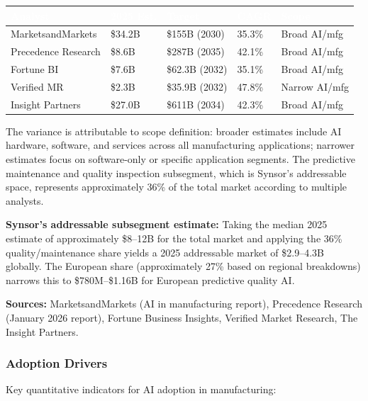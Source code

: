 \documentclass[11pt,letterpaper]{article}
\newcommand{\tableheader}[1]{\textbf{\sffamily\textcolor{white}{#1}}}
\begin{document}
\begin{center}
\begin{tabularx}{\textwidth}{L{3.5cm}C{2cm}C{2cm}C{1.5cm}C{2cm}}
\toprule
{}
\tableheader{Analyst} & \tableheader{2025 Est.} & \tableheader{Target} & \tableheader{CAGR} & \tableheader{Scope} \\
\midrule
MarketsandMarkets & \$34.2B & \$155B (2030) & 35.3\% & Broad AI/mfg \\
Precedence Research & \$8.6B & \$287B (2035) & 42.1\% & Broad AI/mfg \\
Fortune BI & \$7.6B & \$62.3B (2032) & 35.1\% & Broad AI/mfg \\
Verified MR & \$2.3B & \$35.9B (2032) & 47.8\% & Narrow AI/mfg \\
Insight Partners & \$27.0B & \$611B (2034) & 42.3\% & Broad AI/mfg \\
\bottomrule
\end{tabularx}
\end{center}

The variance is attributable to scope definition: broader estimates include AI hardware, software, and services across all manufacturing applications; narrower estimates focus on software-only or specific application segments. The predictive maintenance and quality inspection subsegment, which is Synsor's addressable space, represents approximately 36\% of the total market according to multiple analysts.

\textbf{Synsor's addressable subsegment estimate:} Taking the median 2025 estimate of approximately \$8--12B for the total market and applying the 36\% quality/maintenance share yields a 2025 addressable market of \$2.9--4.3B globally. The European share (approximately 27\% based on regional breakdowns) narrows this to \$780M--\$1.16B for European predictive quality AI.

\textbf{Sources:} MarketsandMarkets (AI in manufacturing report), Precedence Research (January 2026 report), Fortune Business Insights, Verified Market Research, The Insight Partners.

\subsubsection{Adoption Drivers}

Key quantitative indicators for AI adoption in manufacturing:
\end{document}
